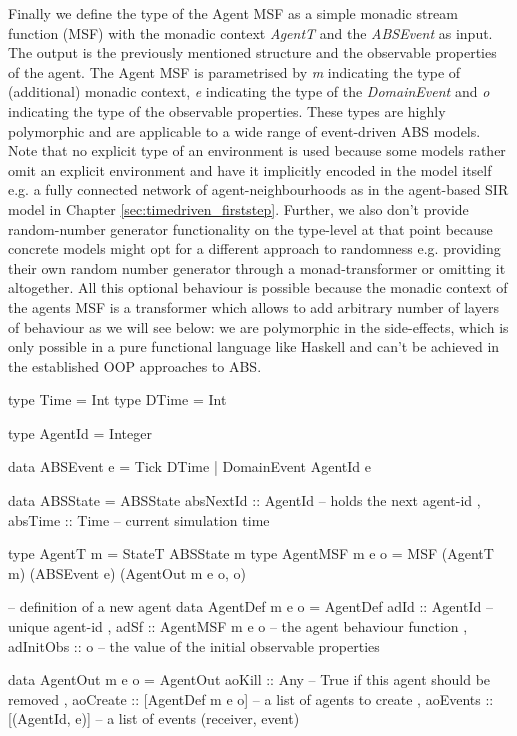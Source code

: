 Finally we define the type of the Agent MSF as a simple monadic stream function (MSF) with the monadic context \textit{AgentT} and the \textit{ABSEvent} as input. The output is the previously mentioned structure and the observable properties of the agent. The Agent MSF is parametrised by \textit{m} indicating the type of (additional) monadic context, \textit{e} indicating the type of the \textit{DomainEvent} and \textit{o} indicating the type of the observable properties. These types are highly polymorphic and are applicable to a wide range of event-driven ABS models. Note that no explicit type of an environment is used because some models rather omit an explicit environment and have it implicitly encoded in the model itself e.g. a fully connected network of agent-neighbourhoods as in the agent-based SIR model in Chapter \ref{sec:timedriven_firststep}. Further, we also don't provide random-number generator functionality on the type-level at that point because concrete models might opt for a different approach to randomness e.g. providing their own random number generator through a monad-transformer or omitting it altogether. All this optional behaviour is possible because the monadic context of the agents MSF is a transformer which allows to add arbitrary number of layers of behaviour as we will see below: we are polymorphic in the side-effects, which is only possible in a pure functional language like Haskell and can't be achieved in the established OOP approaches to ABS.

\begin{HaskellCode}
type Time  = Int
type DTime = Int

type AgentId = Integer

data ABSEvent e = Tick DTime | DomainEvent AgentId e
                
data ABSState = ABSState
  { absNextId :: AgentId -- holds the next agent-id 
  , absTime   :: Time    -- current simulation time
  }

type AgentT m       = StateT ABSState m
type AgentMSF m e o = MSF (AgentT m) (ABSEvent e) (AgentOut m e o, o)

-- definition of a new agent 
data AgentDef m e o = AgentDef
  { adId      :: AgentId         -- unique agent-id
  , adSf      :: AgentMSF m e o  -- the agent behaviour function
  , adInitObs :: o               -- the value of the initial observable properties
  }

data AgentOut m e o = AgentOut 
  { aoKill   :: Any              -- True if this agent should be removed 
  , aoCreate :: [AgentDef m e o] -- a list of agents to create
  , aoEvents :: [(AgentId, e)]   -- a list of events (receiver, event)
  }
\end{HaskellCode}

